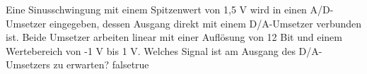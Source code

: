     {Eine Sinusschwingung mit einem Spitzenwert von 1,5 V wird in einen A/D-Umsetzer eingegeben, dessen Ausgang direkt mit einem D/A-Umsetzer verbunden ist. Beide Umsetzer arbeiten linear mit einer Auflösung von 12 Bit und einem Wertebereich von -1 V bis 1 V. Welches Signal ist am Ausgang des D/A-Umsetzers zu erwarten?}
    {}
    {}
    {}
    {}
    {false}{true}